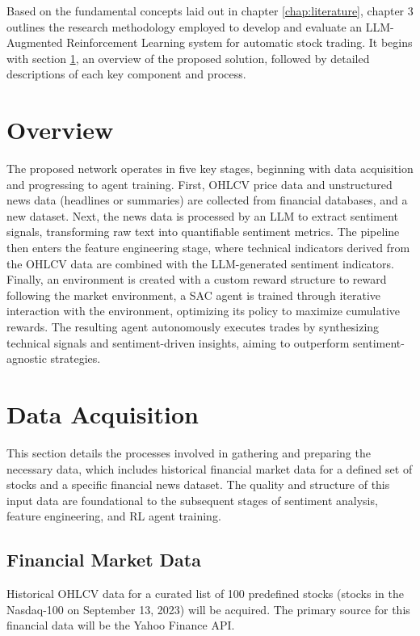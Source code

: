 Based on the fundamental concepts laid out in chapter \ref{chap:literature}, chapter 3  outlines the research methodology employed to develop and evaluate an LLM-Augmented Reinforcement Learning system for automatic stock trading. It begins with section \ref{sec:overview}, an overview of the proposed solution, followed by detailed descriptions of each key component and process.

\section{Overview}
\label{sec:overview}
The proposed network operates in five key stages, beginning with data acquisition and progressing to agent training. First, \gls{OHLCV} price data and unstructured news data (headlines or summaries) are collected from financial databases, and a new dataset. Next, the news data is processed by an \gls{LLM} to extract sentiment signals, transforming raw text into quantifiable sentiment metrics. The pipeline then enters the feature engineering stage, where technical indicators derived from the \gls{OHLCV} data are combined with the \gls{LLM}-generated sentiment indicators. Finally, an environment is created with a custom reward structure to reward following the market environment, a \gls{SAC} agent is trained through iterative interaction with the environment, optimizing its policy to maximize cumulative rewards. The resulting agent autonomously executes trades by synthesizing technical signals and sentiment-driven insights, aiming to outperform sentiment-agnostic strategies.

\section{Data Acquisition}
\label{sec:data}
This section details the processes involved in gathering and preparing the necessary data, which includes historical financial market data for a defined set of stocks and a specific financial news dataset. The quality and structure of this input data are foundational to the subsequent stages of sentiment analysis, feature engineering, and \gls{RL} agent training.

\subsection{Financial Market Data}
Historical \gls{OHLCV} data for a curated list of 100 predefined stocks (stocks in the Nasdaq-100 on September 13, 2023) will be acquired. The primary source for this financial data will be the Yahoo Finance API. 

